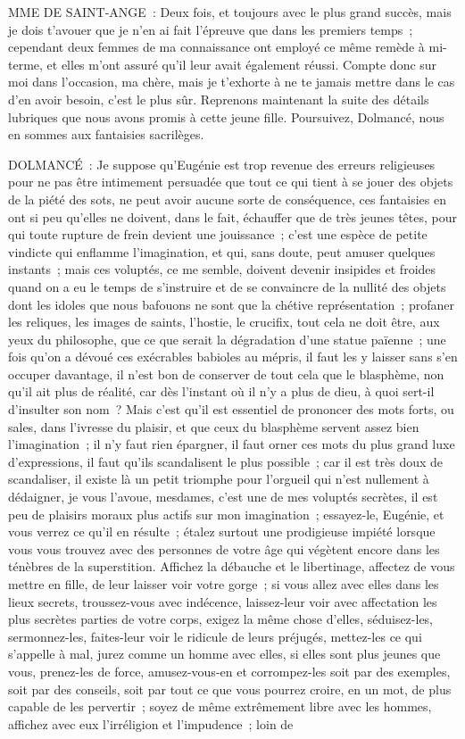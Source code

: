 \documentclass[french,twoside]{book} %
\begin{document}
MME DE SAINT-ANGE : Deux fois, et toujours avec le plus grand succès, mais je dois t’avouer que je n’en ai fait l’épreuve que dans les premiers temps ; cependant deux femmes de ma connaissance ont employé ce même remède à mi-terme, et elles m’ont assuré qu’il leur avait également réussi. Compte donc sur moi dans l’occasion, ma chère, mais je t’exhorte à ne te jamais mettre dans le cas d’en avoir besoin, c’est le plus sûr. Reprenons maintenant la suite des détails lubriques que nous avons promis à cette jeune fille. Poursuivez, Dolmancé, nous en sommes aux fantaisies sacrilèges.\par
DOLMANCÉ : Je suppose qu’Eugénie est trop revenue des erreurs religieuses pour ne pas être intimement persuadée que tout ce qui tient à se jouer des objets de la piété des sots, ne peut avoir aucune sorte de conséquence, ces fantaisies en ont si peu qu’elles ne doivent, dans le fait, échauffer que de très jeunes têtes, pour qui toute rupture de frein devient une jouissance ; c’est une espèce de petite vindicte qui enflamme l’imagination, et qui, sans doute, peut amuser quelques instants ; mais ces voluptés, ce me semble, doivent devenir insipides et froides quand on a eu le temps de s’instruire et de se convaincre de la nullité des objets dont les idoles que nous bafouons ne sont que la chétive représentation ; profaner les reliques, les images de saints, l’hostie, le crucifix, tout cela ne doit être, aux yeux du philosophe, que ce que serait la dégradation d’une statue païenne ; une fois qu’on a dévoué ces exécrables babioles au mépris, il faut les y laisser sans s’en occuper davantage, il n’est bon de conserver de tout cela que le blasphème, non qu’il ait plus de réalité, car dès l’instant où il n’y a plus de dieu, à quoi sert-il d’insulter son nom ? Mais c’est qu’il est essentiel de prononcer des mots forts, ou sales, dans l’ivresse du plaisir, et que ceux du blasphème servent assez bien l’imagination ; il n’y faut rien épargner, il faut orner ces mots du plus grand luxe d’expressions, il faut qu’ils scandalisent le plus possible ; car il est très doux de scandaliser, il existe là un petit triomphe pour l’orgueil qui n’est nullement à dédaigner, je vous l’avoue, mesdames, c’est une de mes voluptés secrètes, il est peu de plaisirs moraux plus actifs sur mon imagination ; essayez-le, Eugénie, et vous verrez ce qu’il en résulte ; étalez surtout une prodigieuse impiété lorsque vous vous trouvez avec des personnes de votre âge qui végètent encore dans les ténèbres de la superstition. Affichez la débauche et le libertinage, affectez de vous mettre en fille, de leur laisser voir votre gorge ; si vous allez avec elles dans les lieux secrets, troussez-vous avec indécence, laissez-leur voir avec affectation les plus secrètes parties de votre corps, exigez la même chose d’elles, séduisez-les, sermonnez-les, faites-leur voir le ridicule de leurs préjugés, mettez-les ce qui s’appelle à mal, jurez comme un homme avec elles, si elles sont plus jeunes que vous, prenez-les de force, amusez-vous-en et corrompez-les soit par des exemples, soit par des conseils, soit par tout ce que vous pourrez croire, en un mot, de plus capable de les pervertir ; soyez de même extrêmement libre avec les hommes, affichez avec eux l’irréligion et l’impudence ; loin de 
\end{document}
